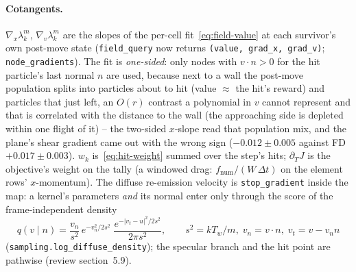 \documentclass[11pt,a4paper]{article}
\numberwithin{equation}{section}
\newcommand{\code}[1]{\texttt{#1}}
\begin{document}
\paragraph{Cotangents.}
$\nabla_x\lambda^m_k$, $\nabla_v\lambda^m_k$ are the slopes of the per-cell
fit~\eqref{eq:field-value} at each survivor's own post-move state
(\code{field\_query} now returns \code{(value, grad\_x, grad\_v)};
\code{node\_gradients}).  The fit is \emph{one-sided}: only nodes with
$v\cdot n > 0$ for the hit particle's last normal $n$ are used, because next to a wall
the post-move population splits into particles about to hit (value $\approx$ the hit's
reward) and particles that just left, an $O(r)$ contrast a polynomial in $v$ cannot
represent and that is correlated with the distance to the wall (the approaching side
is depleted within one flight of it) -- the two-sided $x$-slope read that population
mix, and the plane's shear gradient came out with the wrong sign ($-0.012 \pm 0.005$
against FD $+0.017 \pm 0.003$).  $w_k$ is~\eqref{eq:hit-weight} summed over the step's
hits; $\partial_T J$ is the objective's weight on the tally (a windowed drag:
$f_{\mathrm{num}}/(W\,\Delta t)$ on the element rows' $x$-momentum).  The diffuse
re-emission velocity is \code{stop\_gradient} inside the map: a kernel's parameters
\emph{and} its normal enter only through the score of the frame-independent density
\begin{equation}
\label{eq:diffuse-density}
q(v\mid n) = \frac{v_n}{s^2}\,e^{-v_n^2/2s^2}\;\frac{e^{-|v_t - u|^2/2s^2}}{2\pi s^2},
\qquad s^2 = kT_w/m,\; v_n = v\cdot n,\; v_t = v - v_n n
\end{equation}
(\code{sampling.log\_diffuse\_density}); the specular branch and the hit point are
pathwise (review section~5.9).
\end{document}
